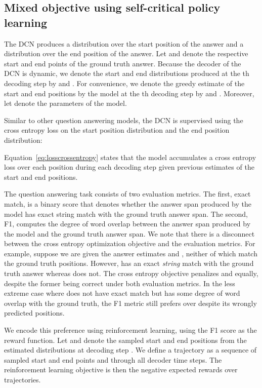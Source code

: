 \documentclass{article} \usepackage{iclr2018_conference,times}
\begin{document}
\subsection{Mixed objective using self-critical policy learning}

The DCN produces a distribution over the start position of the answer and a distribution over the end position of the answer.
Let  and  denote the respective start and end points of the ground truth answer.
Because the decoder of the DCN is dynamic, we denote the start and end distributions produced at the th decoding step by  and .
For convenience, we denote the greedy estimate of the start and end positions by the model at the th decoding step by  and .
Moreover, let  denote the parameters of the model.

Similar to other question answering models, the DCN is supervised using the cross entropy loss on the start position distribution and the end position distribution:


Equation~\ref{eq:losscrossentropy} states that the model accumulates a cross entropy loss over each position during each decoding step given previous estimates of the start and end positions.

The question answering task consists of two evaluation metrics.
The first, exact match, is a binary score that denotes whether the answer span produced by the model has exact string match with the ground truth answer span.
The second, F1, computes the degree of word overlap between the answer span produced by the model and the ground truth answer span.
We note that there is a disconnect between the cross entropy optimization objective and the evaluation metrics. 
For example, suppose we are given the answer estimates  and , neither of which match the ground truth positions.
However,  has an exact \emph{string} match with the ground truth answer whereas  does not.
The cross entropy objective penalizes  and  equally, despite the former being correct under both evaluation metrics.
In the less extreme case where  does not have exact match but has some degree of word overlap with the ground truth, the F1 metric still prefers  over  despite its wrongly predicted positions.

We encode this preference using reinforcement learning, using the F1 score as the reward function.
Let  and  denote the sampled start and end positions from the estimated distributions at decoding step .
We define a trajectory  as a sequence of sampled start and end points  and  through all  decoder time steps.
The reinforcement learning objective is then the negative expected rewards  over trajectories.
\end{document}
